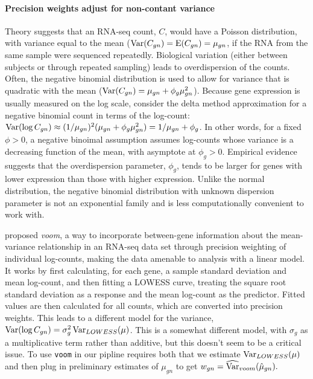 \paragraph{Precision weights adjust for non-contant variance}
Theory suggests that an RNA-seq count, $C$, would have a Poisson distribution, with variance equal to the mean ($\operatorname{Var}(C_{gn})=\operatorname{E}(C_{gn})=\mu_{gn}$, if the RNA from the same sample were sequenced repeatedly. Biological variation (either between subjects or through repeated sampling) leads to overdispersion of the counts. Often, the negative binomial distribution is used to allow for variance that is quadratic with the mean ($\operatorname{Var}(C_{gn})=\mu_{gn}+\phi_g\mu_{gn}^2$). Because gene expression is usually measured on the log scale, consider the delta method  approximation for a negative binomial count in terms of the log-count: $\operatorname{Var}(\log C_{gn}) \approx (1/\mu_{gn})^2(\mu_{gn} + \phi_g\mu_{gn}^2)=1/\mu_{gn} + \phi_g$. In other words, for a fixed $\phi>0$, a negative binoimal assumption assumes log-counts whose variance is a decreasing function of the mean, with asymptote at $\phi_g>0$. Empirical evidence \citep{voom} suggests that the overdispersion parameter, $\phi_g$, tends to be larger for genes with lower expression than those with higher expression. Unlike the normal distribution, the negative binomial distribution with unknown dispersion parameter is not an exponential family and is less computationally convenient to work with. 

\cite{voom} proposed \textit{voom}, a way to incorporate between-gene information about the mean-variance relationship in an RNA-seq data set through precision weighting of individual log-counts, making the data amenable to analysis with a linear model. It works by first calculating, for each gene, a sample standard deviation and mean log-count, and then fitting a LOWESS curve, treating the square root standard deviation as a response and the mean log-count as the predictor. Fitted values are then calculated for all counts, which are converted into precision weights. This leads to a different model for the variance, $\operatorname{Var}(\log C_{gn})=\sigma_{g}^2\operatorname{Var}_{LOWESS}(\mu)$. This is a somewhat different model, with $\sigma_g$ as a multiplicative term rather than additive, but this doesn't seem to be a critical issue. To use \texttt{voom} in our pipline requires both that we estimate $\operatorname{Var}_{LOWESS}(\mu)$ and then plug in preliminary estimates of $\mu_{gn}$ to get $w_{gn} = \widehat{\operatorname{Var}}_{voom}(\hat{\mu}_{gn}).$

